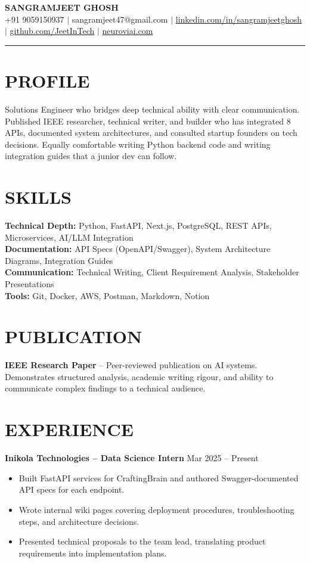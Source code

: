 \documentclass[10pt]{article}
\begin{document}
\begin{center}
{\Large \textbf{SANGRAMJEET GHOSH}} \\[2pt]
{\small +91 9059150937 $|$ sangramjeet47@gmail.com $|$
\href{https://www.linkedin.com/in/sangramjeetghosh}{linkedin.com/in/sangramjeetghosh} $|$
\href{https://github.com/JeetInTech}{github.com/JeetInTech} $|$
\href{https://neuroviai.com}{neuroviai.com}}
\end{center}

\noindent\rule{\textwidth}{0.4pt}

\section*{PROFILE}
Solutions Engineer who bridges deep technical ability with clear communication. Published IEEE researcher, technical writer, and builder who has integrated 8 APIs, documented system architectures, and consulted startup founders on tech decisions. Equally comfortable writing Python backend code and writing integration guides that a junior dev can follow.

\section*{SKILLS}
\textbf{Technical Depth:} Python, FastAPI, Next.js, PostgreSQL, REST APIs, Microservices, AI/LLM Integration \\
\textbf{Documentation:} API Specs (OpenAPI/Swagger), System Architecture Diagrams, Integration Guides \\
\textbf{Communication:} Technical Writing, Client Requirement Analysis, Stakeholder Presentations \\
\textbf{Tools:} Git, Docker, AWS, Postman, Markdown, Notion

\section*{PUBLICATION}
\textbf{IEEE Research Paper} -- Peer-reviewed publication on AI systems. Demonstrates structured analysis, academic writing rigour, and ability to communicate complex findings to a technical audience.

\section*{EXPERIENCE}
\textbf{Inikola Technologies -- Data Science Intern} \hfill Mar 2025 -- Present
\begin{itemize}
\item Built FastAPI services for CraftingBrain and authored Swagger-documented API specs for each endpoint.
\item Wrote internal wiki pages covering deployment procedures, troubleshooting steps, and architecture decisions.
\item Presented technical proposals to the team lead, translating product requirements into implementation plans.
\end{itemize}
\end{document}
